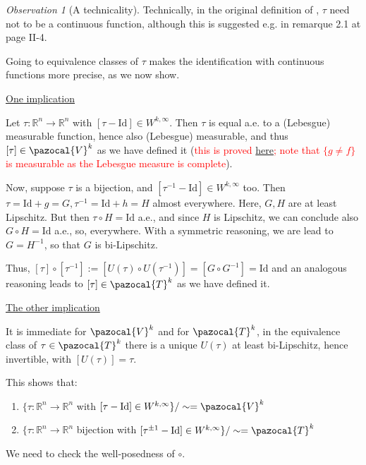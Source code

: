\documentclass[english,a4paper,12pt,oneside]{scrbook}
\theoremstyle{break}
\theoremstyle{remark}
\newtheorem{obs}[equation]{Observation}
\newcommand{\mR}{\mathbb{R}}
\newcommand{\cV}{\pazocal{V}}
\newcommand{\cT}{\pazocal{T}}
\newcommand{\id}{\text{Id}}
\begin{document}
\begin{obs}[A technicality]

Technically, in the original definition of \cite{murat}, $\tau$ need not to be a continuous function, although this is suggested e.g. in remarque 2.1 at page II-4. 

Going to equivalence classes of $\tau$ makes the identification with continuous functions more precise, as we now show.

\underline{One implication}

Let $\tau: \mR^n\rightarrow\mR^n$ with $[\tau-\id] \in W^{k,\infty}$. Then $\tau$ is equal a.e. to a (Lebesgue) measurable function, hence also (Lebesgue) measurable, and thus $[\tau] \in \cV^k$ as we have defined it (\textcolor{red}{this is proved \href{https://heil.math.gatech.edu/6337/spring11/section3.4.pdf}{here}; note that $\{g\neq f\}$ is measurable as the Lebesgue measure is complete}).

Now, suppose $\tau$ is a bijection, and $[\tau^{-1}-\id] \in W^{k,\infty}$ too. Then $\tau = \id + g = G, \tau^{-1} = \id + h = H$ almost everywhere. Here, $G,H$ are at least Lipschitz.
But then $\tau \circ H = \id $ a.e., and since $H$ is Lipschitz, we can conclude also $G\circ H = \id$ a.e., so, everywhere. With a symmetric reasoning, we are lead to $G=H^{-1}$, so that $G$ is bi-Lipschitz.

Thus, $[\tau]\circ [\tau^{-1}]:=[U(\tau)\circ U(\tau^{-1})] = [G\circ G^{-1}] = \id$ and an analogous reasoning leads to $[\tau] \in \cT^k$ as we have defined it.

\underline{The other implication}

It is immediate for $\cV^k$ and for $\cT^k$, in the equivalence class of $\tau \in \cT^k$ there is a unique $U(\tau)$ at least bi-Lipschitz, hence invertible, with $[U(\tau)]=\tau$.

This shows that:

\begin{enumerate}
\item $\{\tau: \mR^n\rightarrow\mR^n$ with $[\tau-\id] \in W^{k,\infty}\} / \sim = \cV^k$
\item $\{\tau: \mR^n\rightarrow\mR^n$ bijection with $[\tau^{\pm 1}-\id] \in W^{k,\infty}\}/\sim = \cT^k$
\end{enumerate}

\end{obs}

We need to check the well-posedness of $\circ$.
\end{document}
